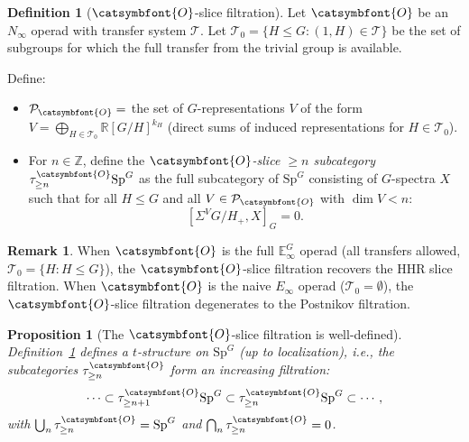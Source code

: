 \documentclass[12pt]{article}
\newtheorem{proposition}{Proposition}
\theoremstyle{definition}
\newtheorem{definition}{Definition}
\newtheorem{remark}{Remark}
\newcommand{\aO}{{\catsymbfont{O}}}
\begin{document}
\begin{definition}[$\aO$-slice filtration]\label{def:aO-slice}
Let $\aO$ be an $N_\infty$ operad with transfer system $\mathcal{T}$. Let $\mathcal{T}_0 = \{H\leq G : (1,H)\in\mathcal{T}\}$ be the set of subgroups for which the full transfer from the trivial group is available.

Define:
\begin{itemize}
\item $\mathcal{P}_\aO = $ the set of $G$-representations $V$ of the form $V = \bigoplus_{H\in\mathcal{T}_0} \mathbb{R}[G/H]^{k_H}$ (direct sums of induced representations for $H\in\mathcal{T}_0$).
\item For $n\in\mathbb{Z}$, define the \emph{$\aO$-slice $\geq n$ subcategory} $\tau_{\geq n}^{\aO}\mathrm{Sp}^G$ as the full subcategory of $\mathrm{Sp}^G$ consisting of $G$-spectra $X$ such that for all $H\leq G$ and all $V\in\mathcal{P}_\aO$ with $\dim V < n$:
$$[\Sigma^V G/H_+, X]_G = 0.$$
\end{itemize}
\end{definition}

\begin{remark}
When $\aO$ is the full $\mathbb{E}_\infty^G$ operad (all transfers allowed, $\mathcal{T}_0 = \{H : H\leq G\}$), the $\aO$-slice filtration recovers the HHR slice filtration. When $\aO$ is the naive $E_\infty$ operad ($\mathcal{T}_0 = \emptyset$), the $\aO$-slice filtration degenerates to the Postnikov filtration.
\end{remark}

\begin{proposition}[The $\aO$-slice filtration is well-defined]\label{prop:welldefined}
Definition~\ref{def:aO-slice} defines a $t$-structure on $\mathrm{Sp}^G$ (up to localization), i.e., the subcategories $\tau_{\geq n}^{\aO}$ form an increasing filtration:
$$\cdots \subset \tau_{\geq n+1}^{\aO}\mathrm{Sp}^G \subset \tau_{\geq n}^{\aO}\mathrm{Sp}^G \subset \cdots,$$
with $\bigcup_n \tau_{\geq n}^{\aO} = \mathrm{Sp}^G$ and $\bigcap_n \tau_{\geq n}^{\aO} = 0$.
\end{proposition}
\end{document}
